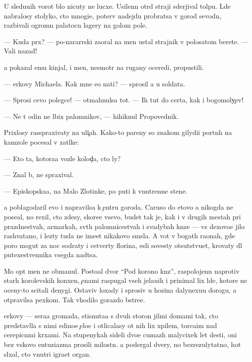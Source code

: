 \documentclass[10pt]{book}
\begin{document}
U sledu{\y}u{\x}ih vorot b{\yi}lo nicuty ne lucxe. Usilenn{\yi}{\y} otr{\ia}d straji sderjival tolpu. L{\io}de{\y} nabralosy stolyko, cto mnogi{\y}e, poter{\ia}v nadejdu probratsa v gorod sevodn{\ia}, razbivali ogromn{\yi}{\y} palatocn{\yi}{\y} lagery na golom pole.

— Kuda pr{\e}x? — po-nararrski zaoral na men{\ia} ustal{\yi}{\y} strajnik v polosatom berete. — Vali nazad!

{\Y}a pokazal {\y}emu kinjal, i men{\ia}, ne\-smo\-tr{\ia} na rugany oceredi, propustili.

— {\C}erkovy Michaela. Kak mne {\y}e{\y}o na{\y}ti? — sprosil {\y}a u soldata.

— Sprosi cevo polegce! — otmahnulsa tot. — Ih tut do certa, kak i bogomoly{\c}ev!

— Ne t{\yi} odin ne l{\io}bix palomnikov, — hihiknul Pro\-po\-ved\-nik.

Prixlosy rasspraxivaty na uli{\c}ah. Kako{\y}-to pareny so znakom gilydi{\y}i portn{\yi}h na kamzole pocesal v za\-t{\yi}l\-ke:

— Eto ta, kotora{\y}a voz\-le kolod{\c}a, cto ly?

— Znal b{\yi}, ne spraxival.

— Episkopska{\y}a, na Malo{\y} Zlotinke, po puti k vnutrenne{\y} stene.

{\Y}a poblagodaril {\y}evo i napravilsa k {\c}entru go\-ro\-da. Caruso do etovo {\y}a nikogda ne pose{\x}al, no rexil, cto zdesy, skore{\y}e vsevo, budet tak je, kak i v drugih mestah pri prazdnestvah, {\y}armarkah, sv{\ia}t{\yi}h palomnicestvah i svadybah kn{\ia}ze{\y} — vs{\e} de\-xo\-vo\-{\y}e jil{\y}o rashvatano, i lezty tuda ne ime{\y}et nikakovo sm{\yi}sla. A vot v bogat{\yi}h ra{\y}onah, gde poro{\y} mogut za noc sodraty i cetverty florina, {\y}esli sovesty otsutstvu{\y}et, krovaty dl{\ia} putexestvennika vsegda na{\y}d{\e}tsa.

Mo{\y} op{\yi}t men{\ia} ne obmanul. Posto{\y}al{\yi}{\y} dvor ``Pod korono{\y} kn{\ia}z{\ia}'', raspolojen\-n{\yi}{\y} naprotiv star{\yi}h korolevskih kon{\io}xen, {\c}enami raspugal vseh jela{\y}u{\x}ih i pri\-ni\-mal lix l{\io}de{\y}, ko\-to\-r{\yi}\-{\y}e ne oceny-to scitali denygi. Ostaviv loxady i sprosiv u ho\-z{\ia}\-{\y}i\-na dalyne{\y}xu{\y}u do\-ro\-gu, {\y}a otpravilsa pexkom. Tak v{\yi}hodilo gorazdo b{\yi}stre{\y}e.

{\C}erkovy — sera{\y}a gromada, stisnuta{\y}a s dvuh storon jil{\yi}mi domami tak, cto predstavl{\ia}la s nimi {\y}edino{\y}e {\c}elo{\y}e i otlicalasy ot nih lix xpilem, torca{\x}im nad cerepic\-n{\yi}\-mi kr{\yi}xami. Na stupenykah sideli dvo{\y}e cumaz{\yi}h malycixek let des{\ia}ti, oni bez vs{\ia}kovo entuziazma prosili milost{\yi}n{\io}. {\Y}a podergal dvery, no bezrezulytatno, hot{\ia} sl{\yi}xal, cto vnutri igra{\y}et organ.
\end{document}
